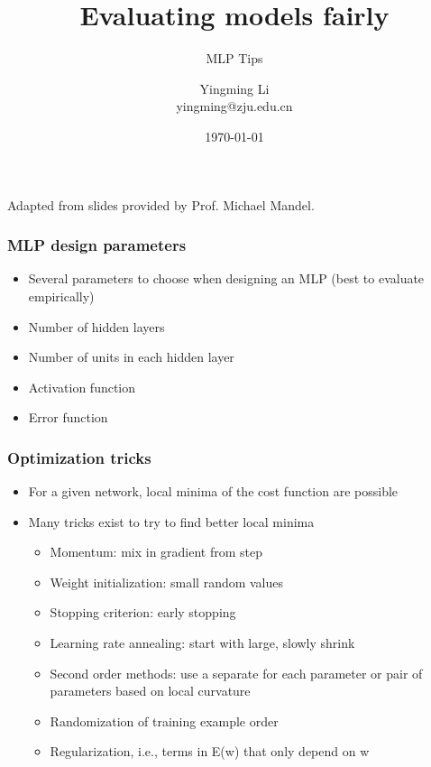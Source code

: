 \documentclass[12pt,notes,mathserif]{beamer}
\title[]{Evaluating models fairly}
\subtitle{\Large MLP Tips}
\author[YingmingLi]{Yingming Li \\ yingming@zju.edu.cn}
\institute[DSERC, ZJU]{Data Science \& Engineering Research Center, ZJU}
\date[\today]{\today}
\begin{document}

\begin{frame}[c]
	\titlepage
	\begin{center}
		Adapted from slides provided by Prof.  Michael Mandel.		
	\end{center}
\end{frame}

\begin{frame}[c]
\frametitle{MLP design parameters}
\begin{itemize}
\item  Several parameters to choose when designing an MLP (best to evaluate empirically)
\item Number of hidden layers
\item Number of units in each hidden layer
\item Activation function
\item Error function
\end{itemize}
\end{frame}
\begin{frame}[c]
\frametitle{Optimization tricks}
\begin{itemize}
\item  For a given network, local minima of the cost function are possible
\item  Many tricks exist to try to find better local minima
		\begin{itemize}
		\item Momentum: mix in gradient from step

		\item Weight initialization: small random values

		\item  Stopping criterion: early stopping

		\item Learning rate annealing: start with large, slowly shrink

		\item Second order methods: use a separate for each parameter or pair of parameters based on local curvature

		\item Randomization of training example order

		\item Regularization, i.e., terms in E(w) that only depend on w

		\end{itemize}

\end{itemize}

\end{frame}
\end{document}
